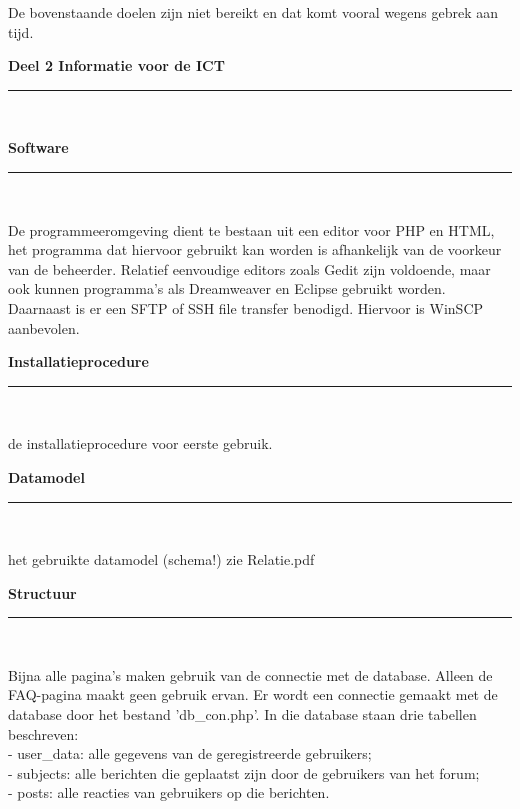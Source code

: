 \documentclass[a4paper,12pt]{article}
\newcommand{\HRule}{\rule{\linewidth}{0.5mm}}
\begin{document}
De bovenstaande doelen zijn niet bereikt en dat komt vooral wegens gebrek aan tijd.


\newpage
\begin{center}
{\LARGE \bfseries Deel 2 Informatie voor de ICT}\\[0.1cm]
\HRule \\[0.5cm]
\end{center}


\newpage
\begin{center}
{\LARGE \bfseries Software}\\[0.1cm]
\HRule \\[0.5cm]
\end{center}
De programmeeromgeving dient te bestaan uit een editor voor PHP en HTML, het programma dat hiervoor gebruikt kan worden is afhankelijk van de voorkeur van de beheerder. Relatief eenvoudige editors zoals Gedit zijn voldoende, maar ook kunnen programma's als Dreamweaver en Eclipse gebruikt worden. Daarnaast is er een SFTP of SSH file transfer benodigd. Hiervoor is WinSCP aanbevolen.

\newpage
\begin{center}
{\LARGE \bfseries Installatieprocedure}\\[0.1cm]
\HRule \\[0.5cm]
\end{center}
de installatieprocedure voor eerste gebruik.

\newpage
\begin{center}
{\LARGE \bfseries Datamodel}\\[0.1cm]
\HRule \\[0.5cm]
\end{center}
het gebruikte datamodel (schema!)
zie Relatie.pdf

\newpage
\begin{center}
{\LARGE \bfseries Structuur}\\[0.1cm]
\HRule \\[0.5cm]
\end{center}
Bijna alle pagina’s maken gebruik van de connectie met de database. Alleen de FAQ-pagina maakt geen gebruik ervan. Er wordt een connectie gemaakt met de database door het bestand 'db\_con.php'. In die database staan drie tabellen beschreven: \\
-	user\_data: alle gegevens van de geregistreerde gebruikers;\\
-	subjects: alle berichten die geplaatst zijn door de gebruikers van het forum;\\
-	posts: alle reacties van gebruikers op die berichten.
\end{document}
